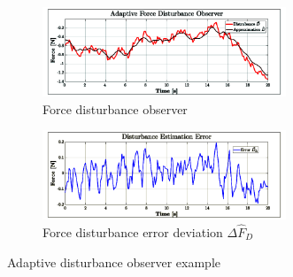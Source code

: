 \begin{figure}[htbp]
\centering
\begin{subfigure}{\textwidth}
\centering
\includegraphics[width=0.8\textwidth]{graphs/disturbance_D}
\vspace{-4pt}
\caption{Force disturbance observer}
\label{fig:disturbance_D}
\end{subfigure}
\begin{subfigure}{\textwidth}
\centering
\includegraphics[width=0.8\textwidth]{graphs/error_DR}
\vspace{-4pt}
\caption{Force disturbance error deviation $\Delta\hat{F}_D$}
\label{fig:error_DR}
\end{subfigure}
\vspace{-6pt}
\caption{Adaptive disturbance observer example}
\label{fig:example_D}
\end{figure}
